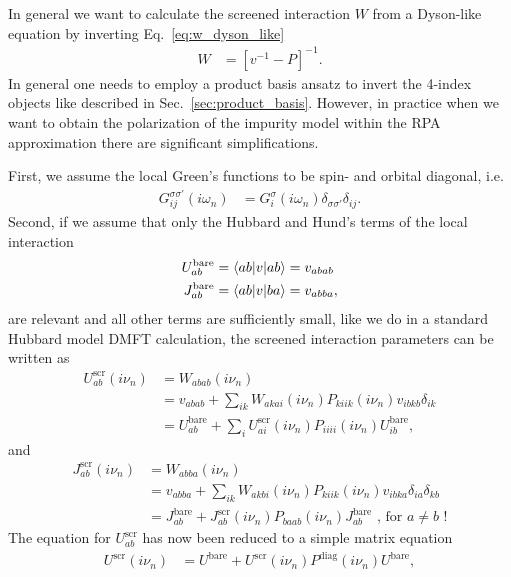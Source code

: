 \documentclass[12pt,a4paper]{scrartcl}
\numberwithin{equation}{section}
\begin{document}
In general we want to calculate the screened interaction $W$ from 
a Dyson-like equation by inverting Eq.~\ref{eq:w_dyson_like}
\begin{align}
 W &= [v^{-1} - P ]^{-1}.
\end{align}
In general one needs to employ a product basis ansatz
to invert the 4-index objects like described in Sec.~\ref{sec:product_basis}.
However, in practice when we want to obtain the polarization of the impurity
model within the RPA approximation there are significant simplifications.

First, we assume the local Green's functions to be spin- and orbital diagonal, i.e.
\begin{align}
 G^{\sigma\sigma'}_{ij}(i\omega_n)
 &= G^{\sigma}_{i}(i\omega_n)\delta_{\sigma\sigma'}\delta_{ij}.
\end{align}
Second, if we assume that only the Hubbard and Hund's terms of the local interaction
\begin{align}
 U^{\mathrm{bare}}_{ab} &= \braket{ab|v|ab} = v_{abab} \\
 J^{\mathrm{bare}}_{ab} &= \braket{ab|v|ba} = v_{abba} ,
\end{align}
are relevant and all other terms are sufficiently small, like 
we do in a standard Hubbard model DMFT calculation, the screened interaction parameters can be written as
\begin{align}
U^{\mathrm{scr}}_{ab}(i\nu_n) &= W_{abab}(i\nu_n) \\
%
&= v_{abab}  + \sum_{ i k }
                     W_{akai} (i\nu_n) P_{kiik}(i\nu_n)
                     v_{ibkb}\delta_{ik} \\
%
& = U^{\mathrm{bare}}_{ab}  + \sum_{i}
                     U^{\mathrm{scr}}_{ai} (i\nu_n) P_{iiii}(i\nu_n)
                     U^{\mathrm{bare}}_{ib} , 
\end{align}
and 
\begin{align}
J^{\mathrm{scr}}_{ab}(i\nu_n) &= W_{abba}(i\nu_n) \\
%
&= v_{abba}  + \sum_{ i k}
                     W_{akbi} (i\nu_n) P_{kiik}(i\nu_n)
                     v_{ibka}\delta_{ia}\delta_{kb} \\
%
& = J^{\mathrm{bare}}_{ab}  + 
                     J^{\mathrm{scr}}_{ab} (i\nu_n) P_{baab}(i\nu_n)
                     J^{\mathrm{bare}}_{ab} \mbox{ , for } a\neq b \mbox{ !}
\end{align}
The equation for $U^{\mathrm{scr}}_{ab}$ has now been reduced to a simple matrix equation
\begin{align}
U^{\mathrm{scr}}(i\nu_n) 
& = U^{\mathrm{bare}}  + U^{\mathrm{scr}} (i\nu_n) P^{\mathrm{diag}}(i\nu_n) U^{\mathrm{bare}},
\end{align}
\end{document}
